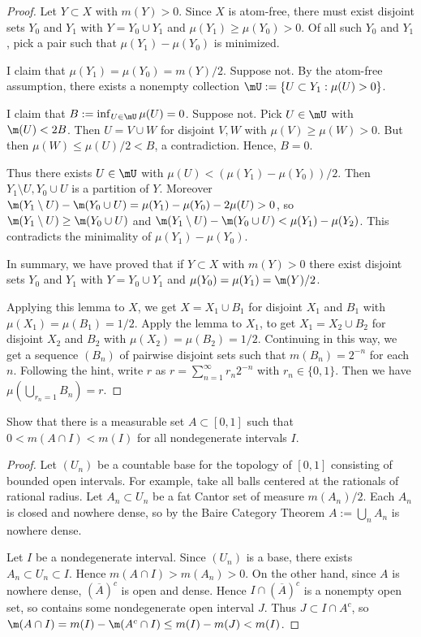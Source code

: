 \documentclass{article}
\begin{document}
\begin{proof}
Let $Y \subset X$ with $m(Y) > 0$. Since $X$ is atom-free, there must exist disjoint sets $Y_0$ and $Y_1$ with $Y = Y_0 \cup Y_1$ and $\mu(Y_1) \ge \mu(Y_0) > 0$.  Of all such $Y_0$ and $Y_1$, pick a pair such that $\mu(Y_1) - \mu(Y_0)$ is minimized. 

I claim that $\mu(Y_1) = \mu(Y_0) = m(Y)/2$.  Suppose not.  By the atom-free assumption, there exists a nonempty collection $\mU := \{ U \subset Y_1 : \mu(U) > 0 \}$. 

 I claim that $B := \inf_{U \in \mU} \mu(U) = 0$.  Suppose not.  Pick $U \in \mU$ with $\m(U) < 2 B$.  Then $U = V \cup W$ for disjoint $V,W$ with $\mu(V) \ge \mu(W) > 0$.  But then $\mu(W) \le \mu(U)/2 < B$, a contradiction.  Hence, $B = 0$.  

Thus there exists $U \in \mU$ with $\mu(U) < (\mu(Y_1) - \mu(Y_0))/2$.  Then $Y_1 \setminus U, Y_0 \cup U$ is a partition of $Y$.  Moreover $\m(Y_1 \setminus U) - \m(Y_0 \cup U) = \mu(Y_1) - \mu(Y_0) - 2\mu(U) > 0$, so $\m(Y_1 \setminus U) \ge \m(Y_0 \cup U)$ and $\m(Y_1 \setminus U) - \m(Y_0 \cup U) < \mu(Y_1) - \mu(Y_2)$.  This contradicts the minimality of $\mu(Y_1) - \mu(Y_0)$. 

In summary, we have proved that if $Y \subset X$ with $m(Y) > 0$ there exist disjoint sets $Y_0$ and $Y_1$ with $Y = Y_0 \cup Y_1$ and $\mu(Y_0) = \mu(Y_1)  = \m(Y)/2$.

Applying this lemma to $X$, we get $X = X_1 \cup B_1$ for disjoint $X_1$ and $B_1$ with $\mu(X_1) = \mu(B_1) = 1/2$.    Apply the lemma to $X_1$, to get $X_1 = X_2 \cup B_2$ for disjoint $X_2$ and $B_2$ with $\mu(X_2) = \mu(B_2) = 1/2$. Continuing in this way, we get a sequence $(B_n)$ of pairwise disjoint sets such that $m(B_n) = 2^{-n}$ for each $n$. Following the hint, write $r$ as $r = \sum_{n=1}^\infty r_n2^{-n}$ with $r_n \in \{0, 1\}$.  Then we have $\mu(\bigcup_{r_n=1} B_n) = r$.

\end{proof}

 Show that there is a measurable set $A \subset [0,1]$ such that $0 < m(A\cap I) < m(I)$ for all nondegenerate intervals $I$.
\begin{proof}
Let $(U_n)$ be a countable base for the topology of $[0,1]$ consisting of bounded open intervals.  For example, take all balls centered at the rationals of rational radius. Let $A_n \subset U_n$ be a fat Cantor set of measure $m(A_n)/2$. Each $A_n$ is closed and nowhere dense, so by the Baire Category Theorem $A := \bigcup_n A_n$ is nowhere dense.  

Let $I$ be a nondegenerate interval.  Since $(U_n)$ is a base, there exists $A_n \subset U_n \subset I$.  Hence $m(A \cap I) > m(A_n) > 0$.   On the other hand, since $A$ is nowhere dense, $(\overline A)^c$ is open and dense.  Hence $I \cap (\overline A)^c$ is a nonempty open set, so contains some nondegenerate open interval $J$.  Thus $J \subset I \cap A^c$, so $\m(A \cap I) =  m(I)  - \m(A^c \cap I) \le m(I) - m(J) < m(I)$.
\end{proof}
\end{document}

